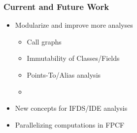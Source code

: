 \documentclass{beamer}
\begin{document}
\begin{frame}
\frametitle{Current and Future Work}
\vspace{-8mm}
\begin{itemize}
	\item Modularize and improve more analyses\\ 
	\begin{itemize}
		\item Call graphs
		\item Immutability of Classes/Fields
		\item Points-To/Alias analysis
		\item \textellipsis
	\end{itemize}
	\item New concepts for IFDS/IDE analysis
	\item Parallelizing computations in FPCF
\end{itemize}
\end{frame}
\end{document}
